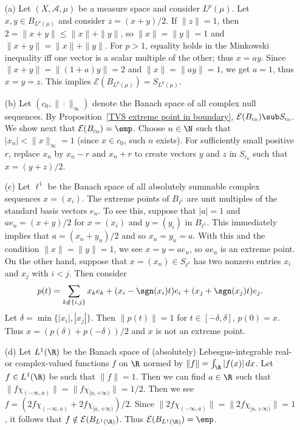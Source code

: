 \begin{example}
\mbox{}
\begin{itemize}
\item[(a)] Let $(X,\mathcal{A},\mu)$ be a measure space and consider $L^p(\mu)$. Let $x,y\in B_{L^p(\mu)}$ and consider $z=(x+y)/2$. If $\|z\|=1$, then $2=\|x+y\|\leq\|x\|+\|y\|$, so $\|x\|=\|y\|=1$ and $\|x+y\|=\|x\|+\|y\|$. For $p>1$, equality holds in the Minkowski inequality iff one vector is a scalar multiple of the other; thus $x=ay$. Since $\|x+y\|=\|(1+a)y\|=2$ and $\|x\|=\|ay\|=1$, we get $a=1$, thus $x=y=z$. This implies $\mathcal{E}(B_{L^p(\mu)})=S_{L^p(\mu)}$.
\item[(b)] Let $(c_0,\|\cdot\|_\infty)$ denote the Banach space of all complex null sequences. By Proposition~\ref{TVS extreme point in boundary}, $\mathcal{E}(B_{c_0})\sub S_{c_0}$. We show next that $\mathcal{E}(B_{c_0})=\emp$. Choose $n\in\N$ such that $|x_n|<\|x\|_\infty=1$ (since $x\in c_0$, such $n$ exists). For sufficiently small positive $r$, replace $x_n$ by $x_n-r$ and $x_n+r$ to create vectors $y$ and $z$ in $S_{c_0}$ such that $x=(y+z)/2$.
\item[(c)] Let $\ell^1$ be the Banach space of all absolutely summable complex sequences $x=(x_i)$. The extreme points of $B_{\ell^1}$ are unit multiples of the standard basis vectors $e_n$. To see this, suppose that $|a|=1$ and $ae_n=(x+y)/2$ for $x=(x_i)$ and $y=(y_i)$ in $B_{\ell^1}$. This immediately implies that $a=(x_n+y_n)/2$ and so $x_n=y_n=a$. With this and the condition $\|x\|=\|y\|=1$, we see $x=y=ae_n$, so $ae_n$ is an extreme point. On the other hand, suppose that $x=(x_n)\in S_{\ell^1}$ has two nonzero entries $x_i$ and $x_j$ with $i<j$. Then consider
\[p(t)=\sum_{k\notin\{i,j\}}x_ke_k+(x_i-\sgn(x_i)t)e_i+(x_j+\sgn(x_j)t)e_j.\]
Let $\delta=\min\{|x_i|,|x_j|\}$. Then $\|p(t)\|=1$ for $t\in[-\delta,\delta]$, $p(0)=x$. Thus $x=(p(\delta)+p(-\delta))/2$ and $x$ is not an extreme point.
\item[(d)] Let $L^1(\R)$ be the Banach space of (absolutely) Lebesgue-integrable real- or complex-valued functions $f$ on $\R$ normed by $\|f\|=\int_\R|f(x)|\,dx$. Let $f\in L^1(\R)$ be such that $\|f\|=1$. Then we can find $a\in\R$ such that $\|f\chi_{(-\infty,a)}\|=\|f\chi_{[a,+\infty)}\|=1/2$. Then we see $f=(2f\chi_{(-\infty,a)}+2f\chi_{[a,+\infty)})/2$. Since $\|2f\chi_{(-\infty,a)}\|=\|2f\chi_{[a,+\infty)}\|=1$, it follows that $f\notin\mathcal{E}(B_{L^1(\R)})$. Thus $\mathcal{E}(B_{L^1(\R)})=\emp$.
\end{itemize}
\end{example}
